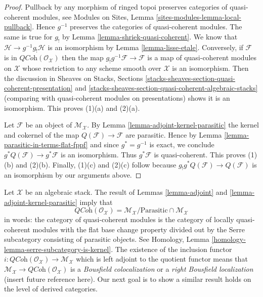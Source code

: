 \begin{proof}
Pullback by any morphism of ringed topoi preserves categories of quasi-coherent
modules, see
Modules on Sites, Lemma \ref{sites-modules-lemma-local-pullback}.
Hence $g^{-1}$ preserves the categories of quasi-coherent modules.
The same is true for $g_!$ by
Lemma \ref{lemma-shriek-quasi-coherent}.
We know that $\mathcal{H} \to g^{-1}g_!\mathcal{H}$ is an isomorphism by
Lemma \ref{lemma-lisse-etale}.
Conversely, if $\mathcal{F}$ is in $\textit{QCoh}(\mathcal{O}_\mathcal{X})$
then the map $g_!g^{-1}\mathcal{F} \to \mathcal{F}$ is a map of quasi-coherent
modules on $\mathcal{X}$ whose restriction to any scheme smooth over
$\mathcal{X}$ is an isomorphism. Then the discussion in
Sheaves on Stacks, Sections
\ref{stacks-sheaves-section-quasi-coherent-presentation} and
\ref{stacks-sheaves-section-quasi-coherent-algebraic-stacks}
(comparing with quasi-coherent modules on presentations)
shows it is an isomorphism. This proves (1)(a) and (2)(a).

\medskip\noindent
Let $\mathcal{F}$ be an object of $\mathcal{M}_\mathcal{X}$. By
Lemma \ref{lemma-adjoint-kernel-parasitic}
the kernel and cokernel of the map
$Q(\mathcal{F}) \to \mathcal{F}$ are parasitic. Hence by
Lemma \ref{lemma-parasitic-in-terms-flat-fppf}
and since $g^* = g^{-1}$ is exact, we conclude
$g^*Q(\mathcal{F}) \to g^*\mathcal{F}$ is an isomorphism. Thus
$g^*\mathcal{F}$ is quasi-coherent. This proves (1)(b) and (2)(b).
Finally, (1)(c) and (2)(c) follow because
$g_!g^*Q(\mathcal{F}) \to Q(\mathcal{F})$ is an isomorphism by
our arguments above.
\end{proof}

\begin{remark}
\label{remark-bousfield-colocalization}
Let $\mathcal{X}$ be an algebraic stack. The result of
Lemmas \ref{lemma-adjoint} and \ref{lemma-adjoint-kernel-parasitic}
imply that
$$
\textit{QCoh}(\mathcal{O}_\mathcal{X}) =
\mathcal{M}_\mathcal{X} / \text{Parasitic} \cap \mathcal{M}_\mathcal{X}
$$
in words: the category of quasi-coherent modules is the category
of locally quasi-coherent modules with the flat base change property
divided out by the Serre subcategory consisting of parasitic objects.
See Homology, Lemma \ref{homology-lemma-serre-subcategory-is-kernel}.
The existence of the inclusion functor
$i : \textit{QCoh}(\mathcal{O}_\mathcal{X}) \to \mathcal{M}_\mathcal{X}$
which is left adjoint to the quotient functor means that
$\mathcal{M}_\mathcal{X} \to \textit{QCoh}(\mathcal{O}_\mathcal{X})$
is a {\it Bousfield colocalization} or a {\it right Bousfield localization}
(insert future reference here). Our next goal is to show a similar result
holds on the level of derived categories.
\end{remark}







